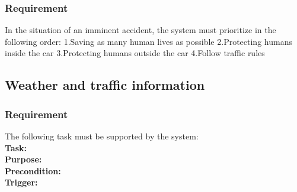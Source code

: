 \documentclass{article}
\begin{document}
      \subsubsection{Requirement}
\hfill \break 
In the situation of an imminent accident, the system must prioritize in the following order:
\hfill \break 
\indent
1.Saving as many human lives as possible
\hfill \break 
\indent
2.Protecting humans inside the car
\hfill \break 
\indent
3.Protecting humans outside the car
\hfill \break 
\indent
4.Follow traffic rules
  \subsection{Weather and traffic information}
\subsubsection {Requirement}
\hfill \break 
\- \- \-The following task must be supported by the system:\\
\hfill \break 
\textbf{Task:} \\ 
\textbf{Purpose:} \\
\textbf{Precondition:} \\ 
\textbf{Trigger:} \\
\\
\end{document}
